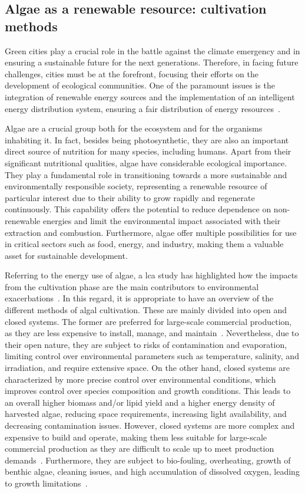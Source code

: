 \subsection{Algae as a renewable resource: cultivation methods}
Green cities play a crucial role in the battle against the climate emergency and in ensuring a sustainable future for the next generations. Therefore, in facing future challenges, cities must be at the forefront, focusing their efforts on the development of ecological communities. One of the paramount issues is the integration of renewable energy sources and the implementation of an intelligent energy distribution system, ensuring a fair distribution of energy resources~\parencite{chew_Algae_2021}.

Algae are a crucial group both for the ecosystem and for the organisms inhabiting it. In fact, besides being photosynthetic, they are also an important direct source of nutrition for many species, including humans. Apart from their significant nutritional qualities, algae have considerable ecological importance. They play a fundamental role in transitioning towards a more sustainable and environmentally responsible society, representing a renewable resource of particular interest due to their ability to grow rapidly and regenerate continuously. This capability offers the potential to reduce dependence on non-renewable energies and limit the environmental impact associated with their extraction and combustion. Furthermore, algae offer multiple possibilities for use in critical sectors such as food, energy, and industry, making them a valuable asset for sustainable development.

%
Referring to the energy use of algae, a \gls{lca} study has highlighted how the impacts from the cultivation phase are the main contributors to environmental exacerbations~\parencite{clarens_Environmental_2010}. In this regard, it is appropriate to have an overview of the different methods of algal cultivation. These are mainly divided into open  and closed systems. The former are preferred for large-scale commercial production, as they are less expensive to install, manage, and maintain~\parencite{roselet_Comparison_2013}. Nevertheless, due to their open nature, they are subject to risks of contamination and evaporation, limiting control over environmental parameters such as temperature, salinity, and irradiation, and require extensive space. On the other hand, closed systems are characterized by more precise control over environmental conditions, which improves control over species composition and growth conditions. This leads to an overall higher biomass and/or lipid yield and a higher energy density of harvested algae, reducing space requirements, increasing light availability, and decreasing contamination issues. However, closed systems are more complex and expensive to build and operate, making them less suitable for large-scale commercial production as they are difficult to scale up to meet production demands~\parencite{resurreccion_Comparison_2012}. Furthermore, they are subject to bio-fouling, overheating, growth of benthic algae, cleaning issues, and high accumulation of dissolved oxygen, leading to growth limitations~\parencite{narala_Comparison_2016}.

